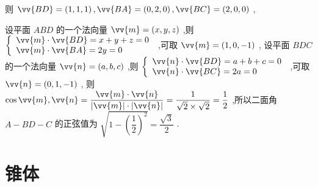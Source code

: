 \begin{enumerate}
\begin{jieda}
\begin{enumerate}
            则 $\vv{BD} = \left( {1,1,1}\right) ,\vv{BA} = \left( {0,2,0}\right) ,\vv{BC} = \left( {2,0,0}\right)$ ,

            设平面 ${ABD}$ 的一个法向量 $\vv{m} = \left( {x,y,z}\right)$ ,则 $\left\{  \begin{array}{l} \vv{m} \cdot  \vv{BD} = x + y + z = 0 \\  \vv{m} \cdot  \vv{BA} = {2y} = 0 \end{array}\right.$ ,可取 $\vv{m} = \left( {1,0, - 1}\right)$ , 设平面 ${BDC}$ 的一个法向量 $\vv{n} = \left( {a,b,c}\right)$ ,则 $\left\{  \begin{array}{l} \vv{n} \cdot  \vv{BD} = a + b + c = 0 \\  \vv{n} \cdot  \vv{BC} = {2a} = 0 \end{array}\right.$ ,可取 $\vv{n} = \left( {0,1, - 1}\right)$ , 则 $\cos \vv{m},\vv{n} = \dfrac{\vv{m} \cdot  \vv{n}}{\left| \vv{m}\right|  \cdot  \left| \vv{n}\right| } = \dfrac{1}{\sqrt{2} \times  \sqrt{2}} = \dfrac{1}{2}$ ,所以二面角 $A - {BD} - C$ 的正弦值为 $\sqrt{1 - {\left( \dfrac{1}{2}\right) }^{2}} = \dfrac{\sqrt{3}}{2}$ .
        \end{enumerate}
    \end{jieda}
\end{enumerate}
\section*{锥体}
